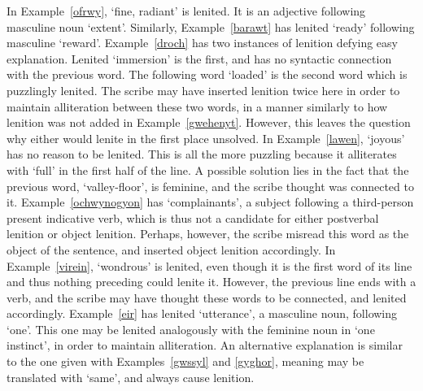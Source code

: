 \begin{mwl}
\end{mwl}
In Example~\ref{ofrwy},  `fine, radiant' is lenited. It is an adjective following masculine noun  `extent'. 
Similarly, Example~\ref{barawt} has lenited  `ready' following masculine  `reward'. 
Example~\ref{droch} has two instances of lenition defying easy explanation. Lenited  `immersion' is the first, and has no syntactic connection with the previous word.  The following word  `loaded' is the second word which is puzzlingly lenited.  The scribe may have inserted lenition twice here in order to maintain alliteration between these two words, in a manner similarly to how lenition was not added in Example~\ref{gwehenyt}. However, this leaves the question why either would lenite in the first place unsolved. 
In Example~\ref{lawen}, 	`joyous' has no reason to be lenited. This is all the more puzzling because it alliterates with  `full' in the first half of the line. A possible solution lies in the fact that the previous word,  `valley-floor', is feminine, and the scribe thought  was connected to it. 
Example~\ref{ochwynogyon} has 	`complainants', a subject following a third-person present indicative verb, which is  thus not a candidate for either postverbal lenition or object lenition. Perhaps, however, the scribe misread this word as the object of the sentence, and inserted object lenition accordingly. 
In Example~\ref{virein},  `wondrous' is lenited, even though it is the first word of its line and thus nothing preceding could lenite it. However, the previous line ends with a verb, and the scribe may have thought these words to be connected, and lenited accordingly. 
Example~\ref{eir} has lenited 	`utterance', a masculine noun, following  `one'. This one may be lenited analogously with the feminine noun in  `one instinct', in order to maintain alliteration. An alternative explanation is similar to the one given with Examples~\ref{gwssyl} and \ref{gyghor}, meaning  may be translated with `same', and always cause lenition.

